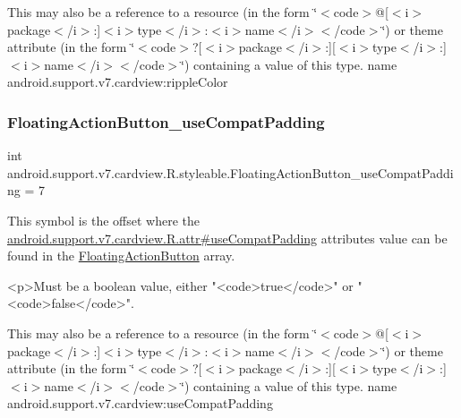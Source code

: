 This may also be a reference to a resource (in the form \char`\"{}$<$code$>$@\mbox{[}$<$i$>$package$<$/i$>$\+:\mbox{]}$<$i$>$type$<$/i$>$\+:$<$i$>$name$<$/i$>$$<$/code$>$\char`\"{}) or theme attribute (in the form \char`\"{}$<$code$>$?\mbox{[}$<$i$>$package$<$/i$>$\+:\mbox{]}\mbox{[}$<$i$>$type$<$/i$>$\+:\mbox{]}$<$i$>$name$<$/i$>$$<$/code$>$\char`\"{}) containing a value of this type.  name android.\+support.\+v7.\+cardview\+:ripple\+Color \mbox{\label{classandroid_1_1support_1_1v7_1_1cardview_1_1R_1_1styleable_a8651097694af5cd9a96507bdc22abdcb}} 
\subsubsection{\texorpdfstring{Floating\+Action\+Button\+\_\+use\+Compat\+Padding}{FloatingActionButton\_useCompatPadding}}
{\footnotesize\ttfamily int android.\+support.\+v7.\+cardview.\+R.\+styleable.\+Floating\+Action\+Button\+\_\+use\+Compat\+Padding = 7\hspace{0.3cm}{\ttfamily [static]}}

This symbol is the offset where the \hyperlink{classandroid_1_1support_1_1v7_1_1cardview_1_1R_1_1attr_a6af56f642b192d4d5ea22a6b22350cd3}{android.\+support.\+v7.\+cardview.\+R.\+attr\#use\+Compat\+Padding} attribute\textquotesingle{}s value can be found in the \hyperlink{classandroid_1_1support_1_1v7_1_1cardview_1_1R_1_1styleable_a1be8c9bcabd399162362befcccf73f59}{Floating\+Action\+Button} array.

\begin{DoxyVerb}      <p>Must be a boolean value, either "<code>true</code>" or "<code>false</code>".
\end{DoxyVerb}
 

This may also be a reference to a resource (in the form \char`\"{}$<$code$>$@\mbox{[}$<$i$>$package$<$/i$>$\+:\mbox{]}$<$i$>$type$<$/i$>$\+:$<$i$>$name$<$/i$>$$<$/code$>$\char`\"{}) or theme attribute (in the form \char`\"{}$<$code$>$?\mbox{[}$<$i$>$package$<$/i$>$\+:\mbox{]}\mbox{[}$<$i$>$type$<$/i$>$\+:\mbox{]}$<$i$>$name$<$/i$>$$<$/code$>$\char`\"{}) containing a value of this type.  name android.\+support.\+v7.\+cardview\+:use\+Compat\+Padding \mbox{\label{classandroid_1_1support_1_1v7_1_1cardview_1_1R_1_1styleable_af65f6d907ddde9ba2d4a7f06cb3facc1}} 
